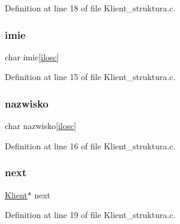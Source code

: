 Definition at line 18 of file Klient\+\_\+struktura.\+c.

\mbox{\label{struct_k_l_i_e_n_t_a278dd55fda880fda278c6f0fc990c152}} 
\subsubsection{\texorpdfstring{imie}{imie}}
{\footnotesize\ttfamily char imie\mbox{[}\hyperlink{_wypozyczenie__struktura_8c_a802c84452854799df868a4a660d3d58a}{ilosc}\mbox{]}}



Definition at line 15 of file Klient\+\_\+struktura.\+c.

\mbox{\label{struct_k_l_i_e_n_t_a44099732d2d6bd00bfec0bdaadac3a35}} 
\subsubsection{\texorpdfstring{nazwisko}{nazwisko}}
{\footnotesize\ttfamily char nazwisko\mbox{[}\hyperlink{_wypozyczenie__struktura_8c_a802c84452854799df868a4a660d3d58a}{ilosc}\mbox{]}}



Definition at line 16 of file Klient\+\_\+struktura.\+c.

\mbox{\label{struct_k_l_i_e_n_t_a7ba03f25bcbff6f0f2c5bc506ec76f7b}} 
\subsubsection{\texorpdfstring{next}{next}}
{\footnotesize\ttfamily \hyperlink{_klient__struktura_8c_afe8e3fcee1af6d1ee1c5346ef4a09cbf}{Klient}$\ast$ next}



Definition at line 19 of file Klient\+\_\+struktura.\+c.

\mbox{\label{struct_k_l_i_e_n_t_a5b8eb8a4fce24d6eff5339e869d2ac34}} 
